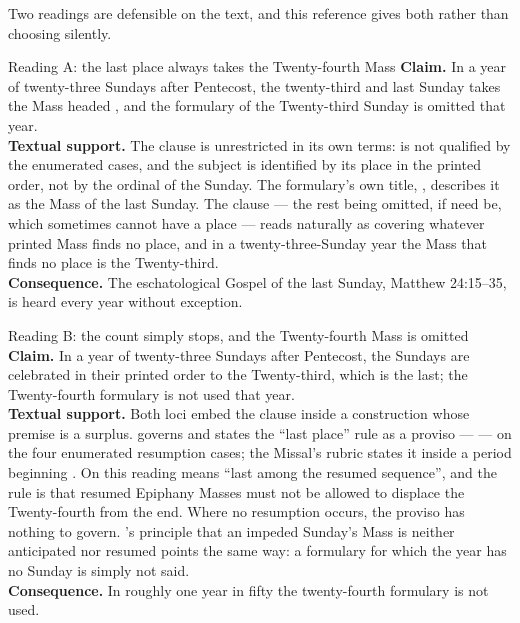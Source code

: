 Two readings are defensible on the text, and this reference gives both rather than choosing
silently.

\begin{studybox}{Reading A: the last place always takes the Twenty-fourth Mass}
\textbf{Claim.} In a year of twenty-three Sundays after Pentecost, the twenty-third and last
Sunday takes the Mass headed , and the
formulary of the Twenty-third Sunday is omitted that year.\\[0.4em]
\textbf{Textual support.} The clause  is unrestricted in its own terms:  is not qualified by
the enumerated cases, and the subject is identified by its place in the printed order, not by
the ordinal of the Sunday. The formulary's own title, , describes it as the
Mass of the last Sunday. The clause  — the rest being omitted, if need be, which sometimes cannot have a place —
reads naturally as covering whatever printed Mass finds no place, and in a twenty-three-Sunday
year the Mass that finds no place is the Twenty-third.\\[0.4em]
\textbf{Consequence.} The eschatological Gospel of the last Sunday, Matthew 24:15--35, is heard
every year without exception.
\end{studybox}

\begin{studybox}{Reading B: the count simply stops, and the Twenty-fourth Mass is omitted}
\textbf{Claim.} In a year of twenty-three Sundays after Pentecost, the Sundays are celebrated in
their printed order to the Twenty-third, which is the last; the Twenty-fourth formulary is not
used that year.\\[0.4em]
\textbf{Textual support.} Both loci embed the  clause inside a construction whose
premise is a surplus.  governs 
and states the ``last place'' rule as a proviso —  — on the four enumerated
resumption cases; the Missal's rubric states it inside a period beginning . On this reading 
means ``last among the resumed sequence'', and the rule is that resumed Epiphany Masses must not
be allowed to displace the Twenty-fourth from the end. Where no resumption occurs, the proviso
has nothing to govern. 's principle that an impeded Sunday's Mass is neither anticipated
nor resumed points the same way: a formulary for which the year has no Sunday is simply not
said.\\[0.4em]
\textbf{Consequence.} In roughly one year in fifty the twenty-fourth formulary is not used.
\end{studybox}


